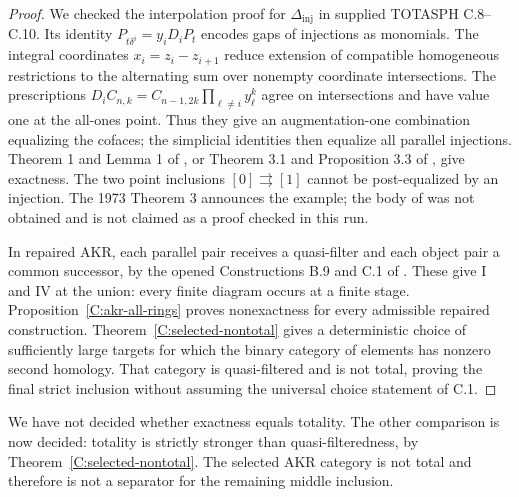 \begin{proof}
We checked the interpolation proof for $\Delta_{\mathrm{inj}}$
in supplied TOTASPH C.8--C.10. Its identity
$P_{t\delta^i}=y_iD_iP_t$ encodes gaps of injections as monomials.
The integral coordinates $x_i=z_i-z_{i+1}$ reduce extension of
compatible homogeneous restrictions to the alternating sum over
nonempty coordinate intersections. The prescriptions
$D_iC_{n,k}=C_{n-1,2k}\prod_{\ell\ne i}y_\ell^k$ agree on
intersections and have value one at the all-ones point. Thus they
give an augmentation-one combination equalizing the cofaces;
the simplicial identities then equalize all parallel injections.
Theorem 1 and Lemma 1 of \citet{IsbellMitchell1973}, or Theorem
3.1 and Proposition 3.3 of \citet{IsbellMitchell1976}, give
exactness. The two point inclusions $[0]\rightrightarrows[1]$
cannot be post-equalized by an injection. The 1973 Theorem 3
announces the example; the body of \citet{Isbell1974} was not
obtained and is not claimed as a proof checked in this run.

In repaired AKR, each parallel pair receives a quasi-filter and
each object pair a common successor, by the opened Constructions
B.9 and C.1 of \citet{AdamekKoubekReiterman1981}. These give I
and IV at the union: every finite diagram occurs at a finite stage.
Proposition~\ref{C:akr-all-rings} proves nonexactness for every
admissible repaired construction. Theorem~\ref{C:selected-nontotal}
gives a deterministic choice of sufficiently large targets for which
the binary category of elements has nonzero second homology. That
category is quasi-filtered and is not total, proving the final strict
inclusion without assuming the universal choice statement of C.1.
\end{proof}

\begin{obstruction}\label{D:undecided-inclusions}
We have not decided whether exactness equals totality. The other
comparison is now decided: totality is strictly stronger than
quasi-filteredness, by Theorem~\ref{C:selected-nontotal}. The selected
AKR category is not total and therefore is not a separator for the
remaining middle inclusion.
\end{obstruction}

